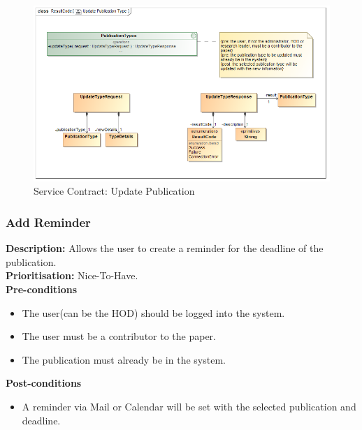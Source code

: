 \documentclass[a4paper]{article}
\begin{document}
            \begin{figure}[H]
            	\centering
            	\includegraphics[width=\textwidth]{5.1.9.Update.Publication.Type.Services.Contract.png}
            	\caption{Service Contract: Update Publication}
            \end{figure}
    
    \pagebreak
    \subsubsection{Add Reminder}
        \textbf{Description:} Allows the user to create a reminder for the deadline of the publication.\\
        \textbf{Prioritisation:} Nice-To-Have.
        \\
        
        \textbf{Pre-conditions}
        \begin{itemize}
        	\item The user(can be the HOD) should be logged into the system.
        	\item The user must be a contributor to the paper.
        	\item The publication must already be in the system.
        \end{itemize}
        
        \textbf{Post-conditions}
        \begin{itemize}
        	\item A reminder via Mail or Calendar will be set with the selected publication and deadline.
        \end{itemize}
        
\end{document}
